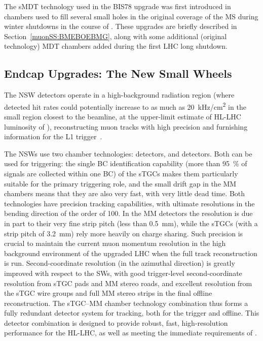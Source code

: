 \documentclass[cernpreprint, atlasdraft=false, UKenglish,british,orcidlogo, texmf, orcidlogo]{atlasdoc}
\begin{document}
The \gls{sMDT} technology used in the \gls{BIS78} upgrade was first introduced in chambers used to fill several small holes in the original coverage of the \gls{MS} during winter shutdowns in the course of \RunTwo. These upgrades are briefly described in Section~\ref{muonSS:BMEBOEBMG}, along with some additional (original technology) \gls{MDT} chambers added during the first \gls{LHC} long shutdown.
 
\subsection{Endcap Upgrades: The New Small Wheels \label{MuonSS:NSW}}
The \gls{NSW} detectors operate in a high-background
radiation region (where detected hit rates could potentially increase to as much as \SI{20}{\kHz/\cm\squared} in the small region closest to the beamline, at the upper-limit estimate of \gls{HL-LHC} luminosity of \lumihllhchigh),
reconstructing muon tracks with high precision and furnishing
information for the \gls{L1} trigger~\cite{ATLAS-TDR-20}.
 
The \glspl{NSW} use two chamber technologies:  detectors, and   detectors.
Both can be used for triggering: the single \gls{BC} identification capability (more than \SI{95}{\percent} of signals are  collected within one \gls{BC}) of the \glspl{sTGC} makes them particularly suitable for the primary
triggering role, and the small drift gap in the \gls{MM} chambers means that they are also very fast, with very little dead time.
Both technologies have precision tracking capabilities, with ultimate resolutions in the bending direction of the order of \SI{100}{\micron}.
In the \gls{MM} detectors the resolution is due in part to their very fine strip pitch (less than \SI{0.5}{\mm}), while the \glspl{sTGC} (with a strip pitch of \SI{3.2}{\mm}) rely more heavily on charge sharing.
Such precision is crucial to maintain the
current muon momentum resolution in the high background
environment of the upgraded \gls{LHC} when the full track reconstruction is run.
Second-coordinate resolution (in the azimuthal direction) is greatly improved with respect to the \glspl{SW}, with good trigger-level second-coordinate resolution from \gls{sTGC} pads and \gls{MM} stereo roads, and excellent resolution from the \gls{sTGC} wire groups and full \gls{MM} stereo strips in the final offline reconstruction.
The \gls{sTGC}--\gls{MM} chamber technology combination thus forms a fully redundant detector system for tracking, both for the trigger and
offline. This detector combination is designed
to provide robust, fast, high-resolution performance for the \gls{HL-LHC}, as well as meeting the immediate requirements of \RunThr.
 
\end{document}
